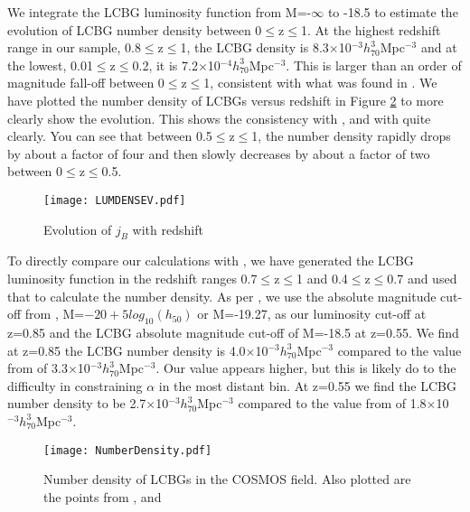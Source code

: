 \documentclass[manuscript]{aastex61}
\begin{document}
We integrate the LCBG luminosity function from M=-$\infty$ to -18.5 to estimate the evolution of LCBG number density between 0$\leq$z$\leq$1. At the highest redshift range in our sample, 0.8$\leq$z$\leq$1, the LCBG density is 8.3$\times$10$^{-3}h_{70}^{3}$Mpc$^{-3}$ and at the lowest, 0.01$\leq$z$\leq$0.2, it is 7.2$\times$10$^{-4}h_{70}^{3}$Mpc$^{-3}$. This is larger than an order of magnitude fall-off between 0$\leq$z$\leq$1, consistent with what was found in \citet{2004ApJ...617.1004W}. We have plotted the number density of LCBGs versus redshift in Figure \ref{fig:NumDensEv} to more clearly show the evolution. This shows the consistency with \citet{2004ApJ...617.1004W}, and with \citet{1997ApJ...489..543P} quite clearly. You can see that between 0.5$\leq$z$\leq$1, the number density rapidly drops by about a factor of four and then slowly decreases by about a factor of two between 0$\leq$z$\leq$0.5. 

\begin{center}
\begin{figure}
\texttt{[image: LUMDENSEV.pdf]}
\caption{Evolution of $j_{B}$ with redshift}
\label{fig:LUMDENSEV}
\end{figure}
\end{center}


To directly compare our calculations with \citet{1997ApJ...489..543P}, we have generated the LCBG luminosity function in the redshift ranges 0.7$\leq$z$\leq$1 and 0.4$\leq$z$\leq$0.7 and used that to calculate the number density. As per \citet{2004ApJ...617.1004W}, we use the absolute magnitude cut-off from \citet{1997ApJ...489..543P}, M=$-20+5log_{10}(h_{50})$ or M=-19.27, as our luminosity cut-off at z=0.85 and the LCBG absolute magnitude cut-off of M=-18.5 at z=0.55. We find at z=0.85 the LCBG number density is 4.0$\times$10$^{-3}h_{70}^{3}$Mpc$^{-3}$ compared to the value from \citet{1997ApJ...489..543P} of 3.3$\times$10$^{-3}h_{70}^{3}$Mpc$^{-3}$. Our value appears higher, but this is likely do to the difficulty in constraining $\alpha$ in the most distant bin. At z=0.55 we find the LCBG number density to be 2.7$\times$10$^{-3}h_{70}^{3}$Mpc$^{-3}$ compared to the value from \citet{1997ApJ...489..543P} of 1.8$\times$10$^{-3}h_{70}^{3}$Mpc$^{-3}$. 

\begin{center}
\begin{figure}
\texttt{[image: NumberDensity.pdf]}
\caption{Number density of LCBGs in the COSMOS field. Also plotted are the points from \citet{1997ApJ...489..543P}, and \citet{2004ApJ...617.1004W}}
\label{fig:NumDensEv}
\end{figure}
\end{center}
\end{document}
